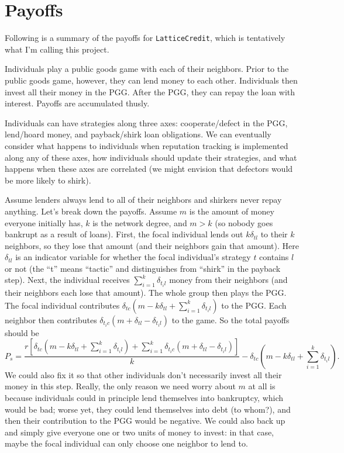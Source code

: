 \documentclass[14pt, a4paper, justified]{article}
\begin{document}
\section*{Payoffs}

Following is a summary of the payoffs for \texttt{LatticeCredit}, which is tentatively what I'm calling this project.

Individuals play a public goods game with each of their neighbors.
Prior to the public goods game, however, they can lend money to each other.
Individuals then invest all their money in the PGG.
After the PGG, they can repay the loan with interest.
Payoffs are accumulated thusly.

Individuals can have strategies along three axes: cooperate/defect in the PGG, lend/hoard money, and payback/shirk loan obligations.
We can eventually consider what happens to individuals when reputation tracking is implemented along any of these axes, how individuals should update their strategies, and what happens when these axes are correlated (we might envision that defectors would be more likely to shirk).

Assume lenders always lend to all of their neighbors and shirkers never repay anything.
Let's break down the payoffs.
Assume $m$ is the amount of money everyone initially has, $k$ is the network degree, and $m > k$ (so nobody goes bankrupt as a result of loans).
First, the focal individual lends out $k\delta_{tl}$ to their $k$ neighbors, so they lose that amount (and their neighbors gain that amount).
Here $\delta_{tl}$ is an indicator variable for whether the focal individual's strategy $t$ contains $l$ or not (the ``t'' means ``tactic'' and distinguishes from ``shirk'' in the payback step).
Next, the individual receives $\sum_{i=1}^k \delta_{t_i l}$ money from their neighbors (and their neighbors each lose that amount).
The whole group then plays the PGG.
The focal individual contributes $\delta_{tc} (m - k\delta_{tl} + \sum_{i=1}^k \delta_{t_i l})$ to the PGG.
Each neighbor then contributes $\delta_{t_i c} (m + \delta_{tl} - \delta_{t_i l})$ to the game.
So the total payoffs should be
\begin{equation}
    P_s = \frac{r[\delta_{tc}(m - k\delta_{tl} + \sum_{i=1}^k \delta_{t_i l}) + \sum_{i=1}^k \delta_{t_i c} (m + \delta_{tl} - \delta_{t_i l})]}{k} - \delta_{tc}(m - k\delta_{tl} + \sum_{i=1}^k \delta_{t_i l}).
\end{equation}
We could also fix it so that other individuals don't necessarily invest all their money in this step.
Really, the only reason we need worry about $m$ at all is because individuals could in principle lend themselves into bankruptcy, which would be bad; worse yet, they could lend themselves into debt (to whom?), and then their contribution to the PGG would be negative.
We could also back up and simply give everyone one or two units of money to invest: in that case, maybe the focal individual can only choose one neighbor to lend to.
\end{document}
